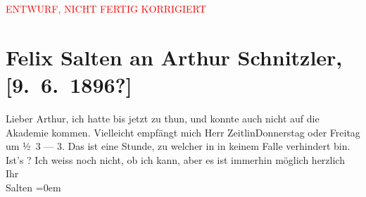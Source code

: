 
\begin{center}
            \textcolor{red}{ENTWURF, NICHT FERTIG KORRIGIERT}
                      \end{center}
            
         
         \renewcommand{\erwaehntePersonen}{Personen: Alexander Zeitlin}
         \renewcommand{\erwaehnteInstitutionen}{Institutionen: Akademie der Bildenden Künste Wien}
         \renewcommand{\erwaehnteOrte}{Orte: Burgtheater, Wien}
         \renewcommand{\erwaehnteWerke}{Werke: Liebelei. Schauspiel in drei Akten}
               \section[Felix Salten an Arthur Schnitzler, {[}9. 6. 1896?{]}]{ Felix Salten an Arthur Schnitzler, {[}9. 6. 1896?{]}}\nopagebreak{}\rehead{ }\begin{ledgroupsized}[t]{13cm}\normalsize\beginnumbering \toendnotes[C]{\smallbreak\pagebreak[2]} 
\toendnotes[C]{\smallbreak}\pstart
           \noindent{}{\pb}Lieber Arthur, ich hatte bis jetzt zu thun, und konnte auch nicht
               auf die Akademie kommen. Vielleicht empfängt mich
               Herr ZeitlinDonnerstag oder Freitag um ½ 3 — 3. Das
               ist eine Stunde, zu welcher in in keinem Falle verhindert bin. Ist’s \label{K_L03172-1v}\label{K_L03172-1h}? Ich weiss noch nicht, ob ich
               kann, aber es ist immerhin möglich \pend
           \pstart
           herzlich Ihr {\\[\baselineskip]}\spacefill\mbox{Salten}\pend
           \leftskip=0em{}
         
         \endnumbering{}\end{ledgroupsized}\begin{anhang}\end{anhang}\newcommand{\dateiname}{L03172}\newcommand{\titel}{Felix Salten an Arthur Schnitzler, [9. 6. 1896?]}\newcommand{\editorInnen}{Martin Anton Müller und Laura Untner}
      